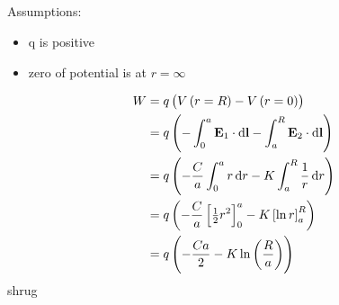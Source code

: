 \subsection{}
Assumptions:
\begin{itemize}
    \item q is positive
    \item zero of potential is at $ r = \infty $
\end{itemize}

\begin{align*}
    W & = q \del{V \del{r = R} - V \del{r = 0}}\\
    & = q \del{- \int_0^a \mathbf{E}_1 \cdot \dif \mathbf{l} - \int_a^R \mathbf{E}_2 \cdot \dif \mathbf{l}}\\
    & = q \del{- \frac{C}{a} \int_0^a r \dif r - K \int_a^R \frac{1}{r} \dif r}\\
    & = q \del{- \frac{C}{a} \sbr{\tfrac{1}{2}r^2}_0^a - K \sbr{\ln{r}}_a^R}\\
    & = q \del{- \frac{Ca}{2} - K \ln{\del{\frac{R}{a}}}}
\end{align*}
shrug

